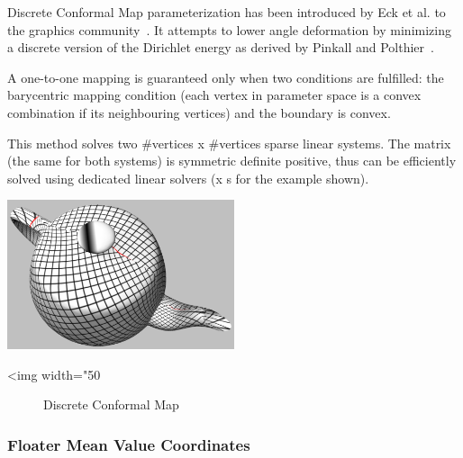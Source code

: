 Discrete Conformal Map parameterization has been introduced by Eck et
al. to the graphics community~\cite{cgal:eddhls-maam-95}. It attempts to
lower angle deformation by minimizing a discrete version of the
Dirichlet energy as derived by Pinkall and
Polthier~\cite{cgal:fh-survey-05}.


A one-to-one mapping is guaranteed only when two conditions are
fulfilled: the barycentric mapping condition (each vertex in parameter
space is a convex combination if its neighbouring vertices) and the
boundary is convex.


This method solves two \#vertices x \#vertices sparse linear
systems. The matrix (the same for both systems) is symmetric definite
positive, thus can be efficiently solved using dedicated linear
solvers (x s for the example shown).

\begin{center}
    \label{parameterization-fig-conformal}
    \begin{ccTexOnly}
        \includegraphics[width=0.5\textwidth]{Parameterization/conformal} %
    \end{ccTexOnly}
    \begin{ccHtmlOnly}
        <img width="50%
    \end{ccHtmlOnly}
    \begin{figure}[h]
        \caption{Discrete Conformal Map}
    \end{figure}
\end{center}


\subsubsection{Floater Mean Value Coordinates}

